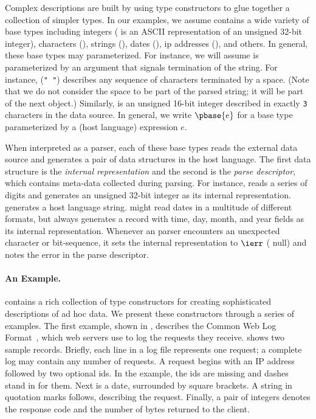 Complex \ipads{} descriptions are built by using type constructors to glue together a collection of simpler types. In our examples, we
assume \ipads{} contains a wide variety of base types including
integers (\Puint{} is an ASCII representation of an unsigned
32-bit integer), characters (\Pchar), strings (\Pstring), dates
(\Pdate), ip addresses (\Pip), and others.  In general, these base
types may parameterized.  For instance, we will assume \Pstring{} is
parameterized by an argument that signals termination of the
string.  For instance, \Pstring({\tt " "}) describes any sequence of
characters terminated by a space. 
(Note that we do not consider the space to be part of the parsed string; 
it will be part of the next object.)
Similarly,  is an unsigned 16-bit
integer described in exactly {\tt 3} characters in the data source.
In general, we write $\pbase{e}$ for a base type parameterized by a
(host language) expression $e$.

When interpreted as a parser, each of these base types reads
the external data source and generates a pair of data structures
in the host language.  The first data structure is the
{\em internal representation}  and
the second is the {\em parse descriptor}, which contains meta-data collected during parsing.
For instance, \Puint{} reads a series of digits and generates an unsigned 32-bit integer as its
internal representation.  \Pstring{} generates a 
host language string.  
\Pdate{} might read dates in a multitude of
different formats, but always generates a record
with time, day, month, and year fields as its internal 
representation.  Whenever an \ipads{} parser encounters
an unexpected character or bit-sequence, it sets the internal representation to
$\ierr$ (\ie{} null) and notes the error in the
parse descriptor.

\paragraph*{An \ipads{} Example.}
\ipads{} contains a rich collection of type constructors for creating
sophisticated descriptions of ad hoc data.  We present these
constructors through a series of examples.  The first example, shown
in , describes the Common Web
Log Format~\cite{wpp}, which web servers use to log the requests they
receive.   shows two sample
records.  Briefly, each line in a log file represents one request;
a complete log may contain any number of requests.  A request begins
with an IP address followed by two optional ids.  In the
example, the ids are missing and dashes stand in for them.  Next is a date,
surrounded by square brackets.  A string in
quotation marks follows, describing the request.  Finally,
a pair of integers denotes the response code and the
number of bytes returned to the client.

